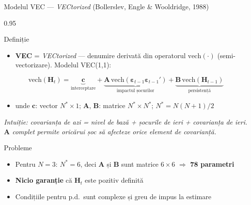 \documentclass[9pt, aspectratio=169, t]{beamer}
\begin{document}
\begin{frame}{Modelul VEC --- \textit{VECtorized} (Bollerslev, Engle \& Wooldridge, 1988)}
    \begin{cminipage}{0.95\textwidth}
    {\footnotesize
    \begin{block}{Definiție}
        \begin{itemize}\setlength{\itemsep}{0pt}
            \item \textbf{VEC} = \textit{VECtorized} --- denumire derivată din operatorul $\text{vech}(\cdot)$ (semi-vectorizare). Modelul VEC(1,1):
        \end{itemize}
        \[
            \text{vech}(\mathbf{H}_t) = \underbrace{\mathbf{c}}_{\text{interceptare}} + \underbrace{\mathbf{A}\,\text{vech}(\boldsymbol{\varepsilon}_{t-1}\boldsymbol{\varepsilon}_{t-1}')}_{\text{impactul șocurilor}} + \underbrace{\mathbf{B}\,\text{vech}(\mathbf{H}_{t-1})}_{\text{persistență}}
        \]
        \begin{itemize}\setlength{\itemsep}{0pt}
            \item unde $\mathbf{c}$: vector $N^* \times 1$; $\mathbf{A}$, $\mathbf{B}$: matrice $N^* \times N^*$; $N^* = N(N+1)/2$
        \end{itemize}
        \textit{Intuiție: covarianța de azi = nivel de bază + șocurile de ieri + covarianța de ieri. $\mathbf{A}$ complet permite oricărui șoc să afecteze orice element de covarianță.}
    \end{block}
    \begin{alertblock}{Probleme}
        \begin{itemize}\setlength{\itemsep}{0pt}
            \item Pentru $N=3$: $N^*=6$, deci $\mathbf{A}$ și $\mathbf{B}$ sunt matrice $6 \times 6$ $\Rightarrow$ \textbf{78 parametri}
            \item \textbf{Nicio garanție} că $\mathbf{H}_t$ este pozitiv definită
            \item Condițiile pentru p.d.\ sunt complexe și greu de impus la estimare
        \end{itemize}
    \end{alertblock}
    }
    \end{cminipage}
\end{frame}
\end{document}
